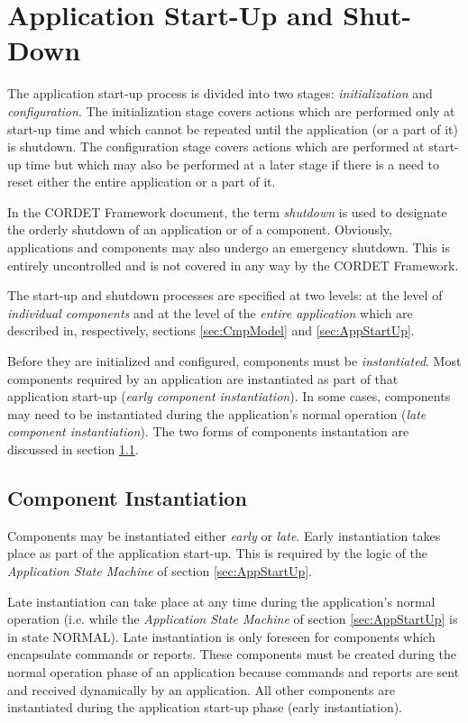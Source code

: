 \documentclass[a4paper,10pt]{article}
\let\stdsection\section
\renewcommand\section{\newpage\stdsection}
\begin{document}
\section{Application Start-Up and Shut-Down}\label{sec:AppStartUpAndShutdown}

The application start-up process is divided into two stages: \textit{initialization} and \textit{configuration}. The initialization stage covers actions which are performed only at start-up time and which cannot be repeated until the application (or a part of it) is shutdown. The configuration stage covers actions which are performed at start-up time but which may also be performed at a later stage if there is a need to reset either the entire application or a part of it. 

In the CORDET Framework document, the term \textit{shutdown} is used to designate the orderly shutdown of an application or of a component. Obviously, applications and components may also undergo an emergency shutdown. This is entirely uncontrolled and is not covered in any way by the CORDET Framework.

The start-up and shutdown processes are specified at two levels: at the level of \textit{individual components} and at the level of the \textit{entire application} which are described in, respectively, sections \ref{sec:CmpModel} and \ref{sec:AppStartUp}.

Before they are initialized and configured, components must be \textit{instantiated}. Most components required by an application are instantiated as part of that application start-up (\textit{early component instantiation}). In some cases, components may need to be instantiated during the application's normal operation (\textit{late component instantiation}). The two forms of components instantation are discussed in section \ref{sec:CmpInst}.

\subsection{Component Instantiation}\label{sec:CmpInst}
Components may be instantiated either \textit{early} or \textit{late}. Early instantiation takes place as part of the application start-up. This is required by the logic of the \textit{Application State Machine} of section \ref{sec:AppStartUp}.

Late instantiation can take place at any time during the application's normal operation (i.e. while the \textit{Application State Machine} of section \ref{sec:AppStartUp} is in state NORMAL). Late instantiation is only foreseen for components which encapsulate commands or reports. These components must be created during the normal operation phase of an application because commands and reports are sent and received dynamically by an application. All other components are instantiated during the application start-up phase (early instantiation).
\end{document}
